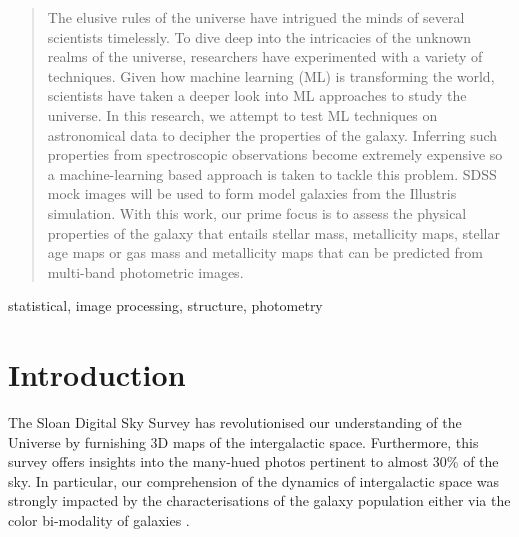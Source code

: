 \documentclass[conference]{IEEEtran}
\begin{document}
\maketitle

\label{firstpage}


\begin{abstract}
The elusive rules of the universe have intrigued the minds of several scientists timelessly. To dive deep into the intricacies of the unknown realms of the universe, researchers have experimented with a variety of techniques. Given how machine learning (ML) is transforming the world, scientists have taken a deeper look into ML approaches to study the universe. In this research, we attempt to test ML techniques on astronomical data to decipher the properties of the galaxy. Inferring such properties from spectroscopic observations become extremely expensive so a machine-learning based approach is taken to tackle this problem. SDSS mock images will be used to form model galaxies from the Illustris simulation. With this work, our prime focus is to assess the physical properties of the galaxy that entails stellar mass, metallicity maps, stellar age maps or gas mass and metallicity maps that can be predicted from multi-band photometric images. 
\end{abstract}

\noindent

\begin{IEEEkeywords}
 statistical, image processing, structure, photometry
\end{IEEEkeywords}

\section{Introduction} \label{sec:intro}

The Sloan Digital Sky Survey \citep{SDSS} has revolutionised our understanding of the Universe by furnishing 3D maps of the intergalactic space. Furthermore, this survey offers insights into the many-hued photos pertinent to almost 30\% of the sky. In particular, our comprehension of the dynamics of intergalactic space was strongly impacted by the characterisations of the galaxy population either via the color bi-modality of galaxies \citep[e.g.][]{Strateva2001}.
\end{document}
